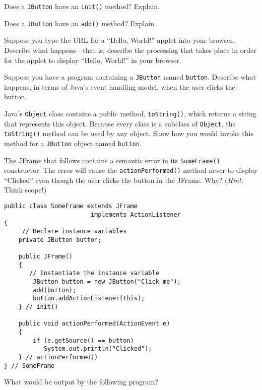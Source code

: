 \begin{EXRtwo}
\item  Does a {\tt JButton} have an {\tt init()} method? Explain.

\item  Does a {\tt JButton} have an {\tt add()} method? Explain.

\item  Suppose you type the URL for a ``Hello, World!'' applet
into your browser.  Describe what happens---that is, describe the
processing that takes place in order for the applet to display ``Hello,
World!'' in your browser.

\item  Suppose you have a program containing a {\tt JButton}
named {\tt button}. Describe what happens, in terms of
Java's event handling model, when the user clicks  the
button.

\item  Java's {\tt Object} class contains a public method, {\tt toString()},
which returns a string that represents this object.  Because every class
is a subclass of {\tt Object}, the {\tt toString()} method can be used
by any object.   Show how you would invoke this method for a {\tt JButton}
object named {\tt button}.

\item  The  JFrame that follows contains a semantic error in
its {\tt SomeFrame()} constructor.  The error will cause the
{\tt actionPerformed()} method never to display ``Clicked''
even though the user clicks the button in the
JFrame.  Why?  ({\it Hint}: Think scope!)

\begin{jjjlisting}
\begin{lstlisting}
public class SomeFrame extends JFrame
                        implements ActionListener
{
     // Declare instance variables
    private JButton button;

    public JFrame()
    {   
       // Instantiate the instance variable
        JButton button = new JButton("Click me");
        add(button);
        button.addActionListener(this);
    } // init()

    public void actionPerformed(ActionEvent e)
    {
        if (e.getSource() == button)
           System.out.println("Clicked");
    } // actionPerformed()
} // SomeFrame
\end{lstlisting}
\end{jjjlisting}

\item  What would be output by the following program?


\end{EXRtwo}

